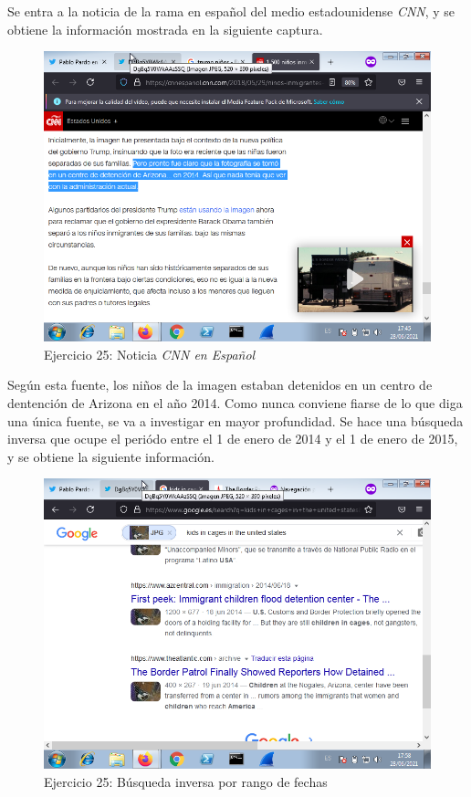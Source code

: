 \documentclass[11pt]{article}
\begin{document}
Se entra a la noticia de la rama en español del medio estadounidense \textit{CNN}, y se obtiene la información mostrada en la siguiente captura.

\begin{figure}[H]
    \caption{Ejercicio 25: Noticia \textit{CNN en Español}}
  \centering
    \includegraphics[scale=0.8]{p05/e31-3.png}
\end{figure}

Según esta fuente, los niños de la imagen estaban detenidos en un centro de dentención de Arizona en el año 2014. Como nunca conviene fiarse de lo que diga una única fuente, se va a investigar en mayor profundidad. Se hace una búsqueda inversa que ocupe el periódo entre el 1 de enero de 2014 y el 1 de enero de 2015, y se obtiene la siguiente información.

\begin{figure}[H]
    \caption{Ejercicio 25: Búsqueda inversa por rango de fechas}
  \centering
    \includegraphics[scale=0.8]{p05/e31-6.png}
\end{figure}
\end{document}
